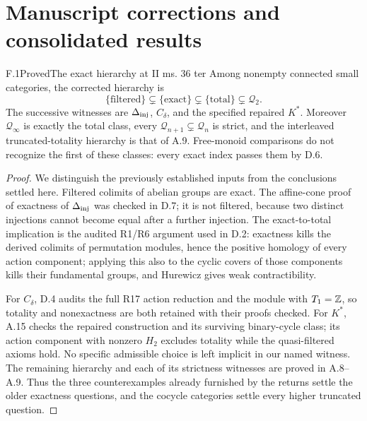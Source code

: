 \section{Manuscript corrections and consolidated results}
\label{sec:F}

\begin{claim}{F.1}{Proved}{The exact hierarchy at II ms. 36 ter}
\label{F:hierarchy}
Among nonempty connected small categories, the corrected hierarchy is
\[
 \{\text{filtered}\}\subsetneq\{\text{exact}\}
 \subsetneq\{\text{total}\}\subsetneq\mathcal Q_2.
\]
The successive witnesses are $\Delta_{\rm inj}$, $C_\delta$, and the
specified repaired $K^*$. Moreover $\mathcal Q_\infty$ is exactly
the total class, every $\mathcal Q_{n+1}\subsetneq\mathcal Q_n$
is strict, and the interleaved truncated-totality hierarchy is
that of A.9. Free-monoid comparisons do not recognize the first
of these classes: every exact index passes them by D.6.
\end{claim}
\begin{proof}
We distinguish the previously established inputs from the conclusions
settled here. Filtered colimits of abelian groups are exact.
The affine-cone proof of exactness of $\Delta_{\rm inj}$ was
checked in D.7; it is not filtered, because two distinct injections
cannot become equal after a further injection. The exact-to-total
implication is the audited R1/R6 argument used in D.2: exactness
kills the derived colimits of permutation modules, hence the
positive homology of every action component; applying this also
to the cyclic covers of those components kills their fundamental
groups, and Hurewicz gives weak contractibility.

For $C_\delta$, D.4 audits the full R17 action reduction and the
module with $T_1=\mathbb Z$, so totality and nonexactness are both
retained with their proofs checked. For $K^*$, A.15 checks the
repaired construction and its surviving binary-cycle class;
its action component with nonzero $H_2$ excludes totality while
the quasi-filtered axioms hold. No specific admissible choice
is left implicit in our named witness. The remaining hierarchy
and each of its strictness witnesses are proved in A.8--A.9.
Thus the three counterexamples already furnished by the returns
settle the older exactness questions, and the cocycle categories
settle every higher truncated question.
\end{proof}

